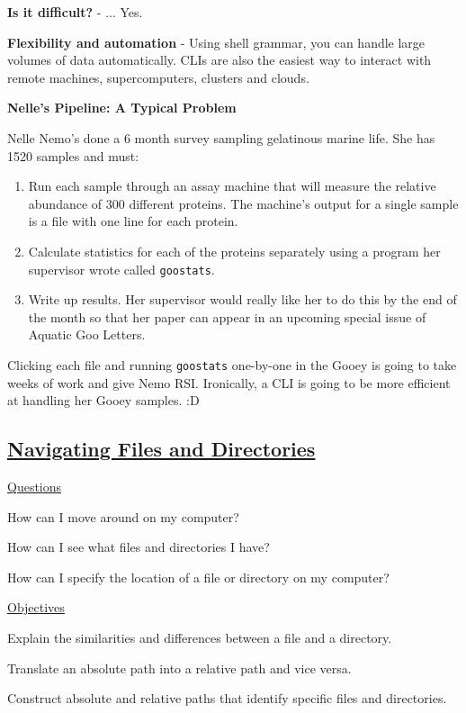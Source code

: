 \documentclass[12pt]{article}
\begin{document}
\newpage
\textbf{Is it difficult?} - ... Yes.

\textbf{Flexibility and automation} - Using shell grammar, you can handle large volumes of data automatically. CLIs are also the easiest way to interact with remote machines, supercomputers, clusters and clouds.

\textbf{Nelle's Pipeline: A Typical Problem}

Nelle Nemo's done a 6 month survey sampling gelatinous marine life. She has 1520 samples and must:
\begin{enumerate}
    \item Run each sample through an assay machine that will measure the relative abundance of 300 different proteins. The machine’s output for a single sample is a file with one line for each protein.
    \item Calculate statistics for each of the proteins separately using a program her supervisor wrote called \texttt{goostats}.
    \item Write up results. Her supervisor would really like her to do this by the end of the month so that her paper can appear in an upcoming special issue of Aquatic Goo Letters.
\end{enumerate}

Clicking each file and running \texttt{goostats} one-by-one in the Gooey is going to take weeks of work and give Nemo RSI. Ironically, a CLI is going to be more efficient at handling her Gooey samples. :D

\subsection{\href{http://swcarpentry.github.io/shell-novice/02-filedir/index.html}{Navigating Files and Directories}}

\color{gray}
\underline{Questions}

How can I move around on my computer?

How can I see what files and directories I have?

How can I specify the location of a file or directory on my computer?

\vspace{1em}
\underline{Objectives}

Explain the similarities and differences between a file and a directory.

Translate an absolute path into a relative path and vice versa.

Construct absolute and relative paths that identify specific files and directories.
\end{document}
